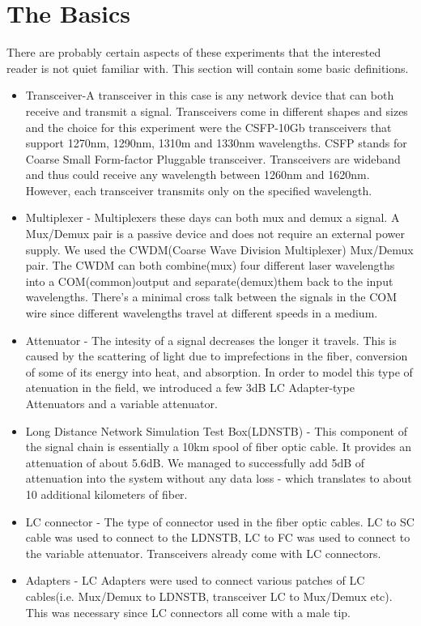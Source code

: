 \documentclass{article}
\begin{document}
\section*{The Basics}
There are probably certain aspects of these experiments that the interested reader is not quiet familiar with. This section will contain some basic definitions.
\begin{itemize}
\item Transceiver-A transceiver in this case is any network device that can both receive and transmit a signal. Transceivers come in different shapes and sizes and the choice for this experiment were the CSFP-10Gb transceivers that support 1270nm, 1290nm, 1310m and 1330nm wavelengths. CSFP stands for Coarse Small Form-factor Pluggable transceiver. Transceivers are wideband and thus could receive any wavelength between 1260nm and 1620nm. However, each transceiver transmits only on the specified wavelength.
\item Multiplexer - Multiplexers these days can both mux and demux a signal. A Mux/Demux pair is a passive device and does not require an external power supply. We used the CWDM(Coarse Wave Division Multiplexer) Mux/Demux pair. The CWDM can both combine(mux) four different laser wavelengths into a COM(common)output and separate(demux)them back to the input wavelengths.  There's a minimal cross talk between the signals in the COM wire since different wavelengths travel at different speeds in a medium. 
\item Attenuator - The intesity of a signal decreases the longer it travels. This is caused by the scattering of light due to imprefections in the fiber, conversion of some of its energy into heat, and absorption. In order to model this type of atenuation in the field, we introduced a few 3dB LC Adapter-type Attenuators and a variable attenuator.
\item Long Distance Network Simulation Test Box(LDNSTB) - This component of the signal chain is essentially a 10km spool of fiber optic cable. It provides an attenuation of about 5.6dB. We managed to successfully add 5dB of attenuation into the system without any data loss - which translates to about 10 additional kilometers of fiber.
\item LC connector - The type of connector used in the fiber optic cables. LC to SC cable was used to connect to the LDNSTB, LC to FC was used to connect to the variable attenuator. Transceivers already come with LC connectors. 
\item Adapters - LC Adapters were used to connect various patches of LC cables(i.e. Mux/Demux to LDNSTB, transceiver LC to Mux/Demux etc). This was necessary since LC connectors all come with a male tip. 
\end{itemize}
\end{document}
